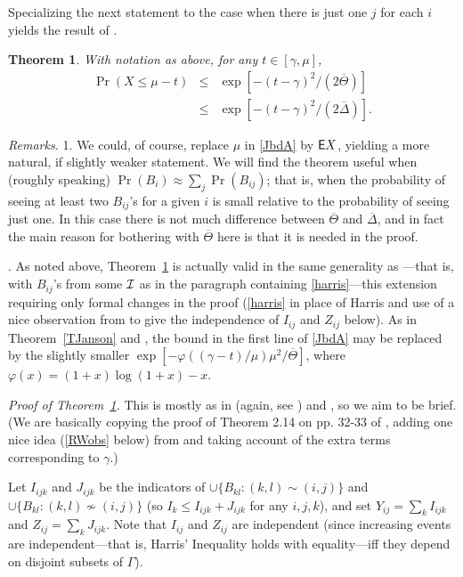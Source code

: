 \documentclass[letterpaper,11pt]{article}
\newtheorem{thm}{Theorem}[section]
\newcommand{\mn}[0]{\medskip\noindent}
\newcommand{\nin}[0]{\noindent}
\newcommand{\ov}[0]{\overline}
\newcommand{\I}[0]{{\cal I}}
\newcommand{\xxx}[0]{B}
\newcommand{\0}[0]{\emptyset}
\newcommand{\gc}[0]{\gamma }
\newcommand{\gD}[0]{\Delta }
\newcommand{\gG}[0]{\Gamma }
\begin{document}
Specializing the next statement to
the case when there is just one $j$ for each $i$
yields the result of \cite{RW}.


\begin{thm}\label{TRW}
With notation as above, for any $t\in [\gc,\mu]$,
\begin{eqnarray}\label{JbdA}
\Pr(X\leq \mu -t)
&\leq &\exp[-(t-\gc)^2/(2\ov{\Theta})] \nonumber\\
&\leq &\exp[-(t-\gc)^2/(2\ov{\gD})].
\end{eqnarray}
\end{thm}

\nin
{\em Remarks.}
1.  We could, of course, replace $\mu$ in \eqref{JbdA}
by ${\sf E} X$, yielding a more natural, if slightly weaker
statement.
We will find the theorem useful
when (roughly speaking)
$\Pr(\xxx_i)\approx \sum_j\Pr(\xxx_{ij})$; that is,
when the probability of seeing at least two $\xxx_{ij}$'s
for a given $i$ is small relative to the probability
of seeing just one.  In this case there is not much difference
between $\ov{\Theta}$ and $\ov{\gD}$, and in fact the main
reason for bothering with $\ov{\Theta}$ here is that it is needed
in the proof.





\mn
2.  As noted above, Theorem~\ref{TRW}
is actually valid in the same generality as
\cite{RW}---that is, with $B_{ij}$'s from some $\I$
as in the paragraph containing \eqref{harris}---this extension
requiring only formal changes in the proof
(\eqref{harris} in place of Harris and use of
a nice observation from \cite{RW} to give the independence of
$I_{ij}$ and $Z_{ij}$ below).
As in Theorem~\ref{TJanson} and \cite{RW},
the bound in the first line of
\eqref{JbdA} may be replaced
by the slightly smaller
$\exp[-\varphi((\gc-t)/\mu)\mu^2/\ov{\Theta}]$,
where $\varphi(x) = (1+x)\log (1+x)-x$.



\mn
{\em Proof of Theorem~\ref{TRW}.}
This is mostly as in
\cite{Janson} (again, see \cite{JLR}) and \cite{RW},
so we aim to be brief.
(We are basically copying the proof of Theorem 2.14
on pp. 32-33 of \cite{JLR}, adding one nice idea
(\eqref{RWobs} below) from \cite{RW} and
taking account of the extra terms corresponding to $\gc$.)






\medskip
Let
$I_{ijk}$ and $J_{ijk}$ be
the indicators of
$%
\cup\{\xxx_{kl}:(k,l)\sim (i,j)\}$ and
$%
\cup\{\xxx_{kl}:(k,l)\not\sim (i,j)\}$
(so $I_k\leq I_{ijk}+J_{ijk}$ for any $i,j,k$),
and set
$Y_{ij} = \sum_kI_{ijk}$ and
$Z_{ij} = \sum_kJ_{ijk}$.
Note that $I_{ij}$ and $Z_{ij}$ are independent
(since increasing events are independent---that is,
Harris' Inequality holds with equality---iff
they depend on disjoint subsets of $\gG$).
\end{document}
